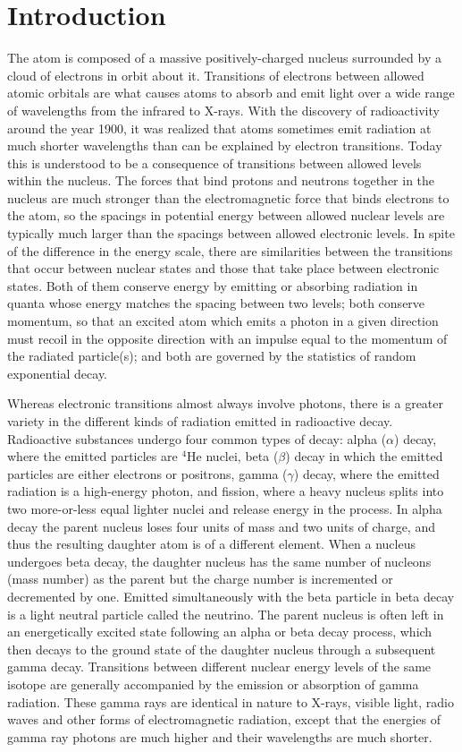 \documentclass{revtex4}
\begin{document}
\section{Introduction}

The atom is composed of a massive positively-charged nucleus surrounded by
a cloud of electrons in orbit about it.  Transitions of electrons between
allowed atomic orbitals are what causes atoms to absorb and emit light over
a wide range of wavelengths from the infrared to X-rays.  With the discovery
of radioactivity around the year 1900, it was realized that atoms sometimes
emit radiation at much shorter wavelengths than can be explained by electron
transitions.  Today this is understood to be a consequence of transitions
between allowed levels within the nucleus.  The forces that bind protons
and neutrons together in the nucleus are much stronger than the electromagnetic
force that binds electrons to the atom, so the spacings in potential energy
between allowed nuclear levels are typically much larger than the spacings
between allowed electronic levels.  In spite of the difference in the energy
scale, there are similarities between the transitions that occur between
nuclear states and those that take place between electronic states.  Both
of them conserve energy by emitting or absorbing radiation in quanta whose
energy matches the spacing between two levels; both conserve momentum, so
that an excited atom which emits a photon in a given direction must recoil
in the opposite direction with an impulse equal to the momentum of the
radiated particle(s); and both are governed by the statistics of random
exponential decay.

Whereas electronic transitions almost always involve photons, there is a
greater variety in the different kinds of radiation emitted in radioactive
decay.  Radioactive substances undergo four common types of decay:
alpha ($\alpha$) decay, where the emitted particles are $^4$He nuclei,
beta ($\beta$) decay in which the emitted particles are either electrons or
positrons, gamma ($\gamma$) decay, where the emitted radiation is a high-energy
photon, and fission, where a heavy nucleus splits into two more-or-less equal
lighter nuclei and release energy in the process. In alpha decay the parent
nucleus loses four units of mass and two units of charge, and thus the
resulting daughter atom is of a different element. When a nucleus undergoes
beta decay, the daughter nucleus has the same number of nucleons (mass number)
as the parent but the charge number is incremented or decremented by one.
Emitted simultaneously with the beta particle in beta decay is a light neutral
particle called the neutrino.  The parent nucleus is often left in an
energetically excited state following an alpha or beta decay process,
which then decays to the ground state of the daughter nucleus through a
subsequent gamma decay. Transitions between different nuclear energy levels
of the same isotope are generally accompanied by the emission or absorption
of gamma radiation.  These gamma rays are identical in nature to X-rays,
visible light, radio waves and other forms of electromagnetic radiation,
except that the energies of gamma ray photons are much higher and their
wavelengths are much shorter.
\end{document}
